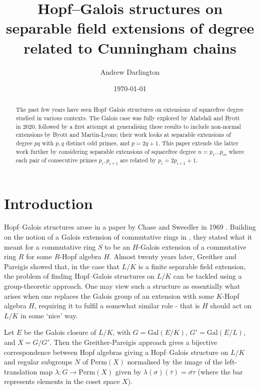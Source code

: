 \documentclass[a4paper,reqno]{amsart}
\title[Cunningham Chains]{Hopf--Galois structures on separable field extensions of degree related to Cunningham chains}
\author{Andrew Darlington}
\date{\today}
\theoremstyle{definition}
\newcommand{\Gal}{\mathrm{Gal}}
\begin{document}
\begin{abstract}
    The past few years have seen Hopf--Galois structures on extensions of squarefree degree studied in various contexts. The Galois case was fully explored by Alabdali and Byott in 2020, followed by a first attempt at generalising these results to include non-normal extensions by Byott and Martin-Lyons; their work looks at separable extensions of degree $pq$ with $p,q$ distinct odd primes, and $p=2q+1$. This paper extends the latter work further by considering separable extensions of squarefree degree $n=p_1...p_m$ where each pair of consecutive primes $p_i,p_{i+1}$ are related by $p_i=2p_{i+1}+1$.
\end{abstract}
\maketitle

	
\section{Introduction}
Hopf--Galois structures arose in a paper by Chase and Sweedler in 1969 \cite{CS69}. Building on the notion of a Galois extension of commutative rings in \cite{CHR65}, they stated what it meant for a commutative ring $S$ to be an $H$-Galois extension of a commutative ring $R$ for some $R$-Hopf algebra $H$. Almost twenty years later, Greither and Pareigis \cite{GP87} showed that, in the case that $L/K$ is a finite separable field extension, the problem of finding Hopf--Galois structures on $L/K$ can be tackled using a group-theoretic approach. One may view such a structure as essentially what arises when one replaces the Galois group of an extension with some $K$-Hopf algebra $H$, requiring it to fulfil a somewhat similar role - that is $H$ should act on $L/K$ in some `nice' way. 

Let $E$ be the Galois closure of $L/K$, with $G=\Gal(E/K)$, $G'=\Gal(E/L)$, and $X=G/G'$. Then the Greither-Pareigis approach gives a bijective correspondence between Hopf algebras giving a Hopf--Galois structure on $L/K$ and regular subgroups $N$ of $\text{Perm}(X)$ normalised by the image of the left-translation map $\lambda: G \rightarrow \text{Perm}(X)$ given by $\lambda(\sigma)(\overline{\tau})=\overline{\sigma\tau}$ (where the bar represents elements in the coset space $X$). 
\end{document}
